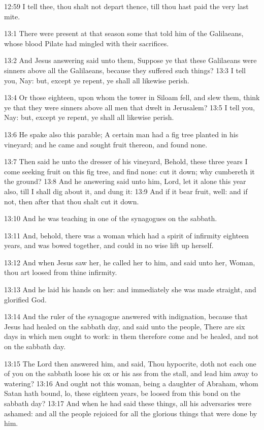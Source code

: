 12:59 I tell thee, thou shalt not depart thence, till thou hast paid the very last mite.

13:1 There were present at that season some that told him of the Galilaeans, whose blood Pilate had mingled with their sacrifices.

13:2 And Jesus answering said unto them, Suppose ye that these Galilaeans were sinners above all the Galilaeans, because they suffered such things?  13:3 I tell you, Nay: but, except ye repent, ye shall all likewise perish.

13:4 Or those eighteen, upon whom the tower in Siloam fell, and slew them, think ye that they were sinners above all men that dwelt in Jerusalem?  13:5 I tell you, Nay: but, except ye repent, ye shall all likewise perish.

13:6 He spake also this parable; A certain man had a fig tree planted in his vineyard; and he came and sought fruit thereon, and found none.

13:7 Then said he unto the dresser of his vineyard, Behold, these three years I come seeking fruit on this fig tree, and find none: cut it down; why cumbereth it the ground?  13:8 And he answering said unto him, Lord, let it alone this year also, till I shall dig about it, and dung it: 13:9 And if it bear fruit, well: and if not, then after that thou shalt cut it down.

13:10 And he was teaching in one of the synagogues on the sabbath.

13:11 And, behold, there was a woman which had a spirit of infirmity eighteen years, and was bowed together, and could in no wise lift up herself.

13:12 And when Jesus saw her, he called her to him, and said unto her, Woman, thou art loosed from thine infirmity.

13:13 And he laid his hands on her: and immediately she was made straight, and glorified God.

13:14 And the ruler of the synagogue answered with indignation, because that Jesus had healed on the sabbath day, and said unto the people, There are six days in which men ought to work: in them therefore come and be healed, and not on the sabbath day.

13:15 The Lord then answered him, and said, Thou hypocrite, doth not each one of you on the sabbath loose his ox or his ass from the stall, and lead him away to watering?  13:16 And ought not this woman, being a daughter of Abraham, whom Satan hath bound, lo, these eighteen years, be loosed from this bond on the sabbath day?  13:17 And when he had said these things, all his adversaries were ashamed: and all the people rejoiced for all the glorious things that were done by him.

